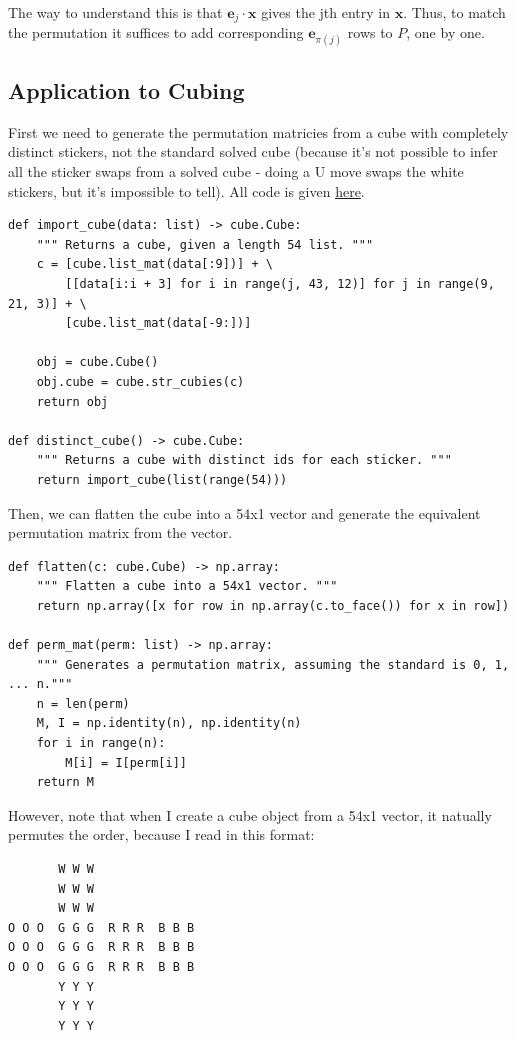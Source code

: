 \documentclass[11pt, oneside]{article}
\newcommand{\ve}[1]{\mathbf{#1}}
\theoremstyle{plain}
\begin{document}
The way to understand this is that \( \ve{e}_j \cdot \ve{x} \) gives the
jth entry in \( \ve{x} \). Thus, to match the permutation it suffices to
add corresponding \( \ve{e}_{\pi(j)} \) rows to \( P \), one by one.

\subsection{Application to Cubing}

First we need to generate the permutation matricies from a cube with completely
distinct stickers, not the standard solved cube (because it's not possible to infer
all the sticker swaps from a solved cube - doing a U move swaps the white stickers,
but it's impossible to tell). All code is given \href{https://github.com/stephen-huan/Cube-Solver/blob/master/linear.py}{here}.

\begin{verbatim}
def import_cube(data: list) -> cube.Cube:
    """ Returns a cube, given a length 54 list. """
    c = [cube.list_mat(data[:9])] + \
        [[data[i:i + 3] for i in range(j, 43, 12)] for j in range(9, 21, 3)] + \
        [cube.list_mat(data[-9:])]

    obj = cube.Cube()
    obj.cube = cube.str_cubies(c)
    return obj

def distinct_cube() -> cube.Cube:
    """ Returns a cube with distinct ids for each sticker. """
    return import_cube(list(range(54)))
\end{verbatim}

Then, we can flatten the cube into a 54x1 vector and generate the equivalent
permutation matrix from the vector.

\begin{verbatim}
def flatten(c: cube.Cube) -> np.array:
    """ Flatten a cube into a 54x1 vector. """
    return np.array([x for row in np.array(c.to_face()) for x in row])

def perm_mat(perm: list) -> np.array:
    """ Generates a permutation matrix, assuming the standard is 0, 1, ... n."""
    n = len(perm)
    M, I = np.identity(n), np.identity(n)
    for i in range(n):
        M[i] = I[perm[i]]
    return M
\end{verbatim}

However, note that when I create a cube object from a 54x1 vector,
it natually permutes the order, because I read in this format:
\begin{verbatim}
       W W W
       W W W
       W W W
O O O  G G G  R R R  B B B
O O O  G G G  R R R  B B B
O O O  G G G  R R R  B B B
       Y Y Y
       Y Y Y
       Y Y Y
\end{verbatim}
\end{document}
